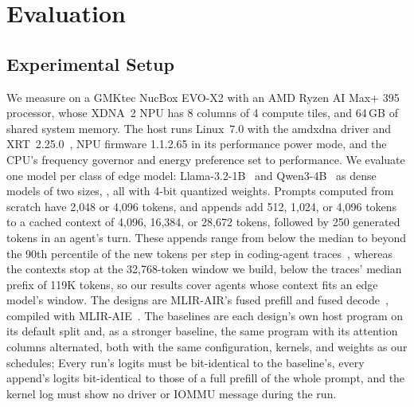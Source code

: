 \section{Evaluation}
\label{sec:eval}

\subsection{Experimental Setup}
\label{subsec:setup}

We measure on a GMKtec NucBox EVO-X2 with an AMD Ryzen\texttrademark{} AI Max+ 395 processor, whose XDNA~2 NPU has 8 columns of 4 compute tiles, and 64\,GB of shared system memory.
The host runs Linux~7.0 with the amdxdna driver and XRT~2.25.0~\citep{xdna-driver,xrt-repo}, NPU firmware 1.1.2.65 in its performance power mode, and the CPU's frequency governor and energy preference set to performance.
We evaluate one model per class of edge model: Llama-3.2-1B~\citep{meta2024llama32} and Qwen3-4B~\citep{yang2025qwen3} as dense models of two sizes, , all with 4-bit quantized weights.
Prompts computed from scratch have 2{,}048 or 4{,}096 tokens, and appends add 512, 1{,}024, or 4{,}096 tokens to a cached context of 4{,}096, 16{,}384, or 28{,}672 tokens, followed by 250 generated tokens in an agent's turn.
These appends range from below the median to beyond the 90th percentile of the new tokens per step in coding-agent traces~\citep{zhu2026tracelab}, whereas the contexts stop at the 32{,}768-token window we build, below the traces' median prefix of 119K tokens, so our results cover agents whose context fits an edge model's window.
The designs are MLIR-AIR's fused prefill and fused decode~\citep{wang2026mlirair}, compiled with MLIR-AIE~\citep{mlir-aie-repo}.
The baselines are each design's own host program on its default split and, as a stronger baseline, the same program with its attention columns alternated, both with the same configuration, kernels, and weights as our schedules; 
Every run's logits must be bit-identical to the baseline's, every append's logits bit-identical to those of a full prefill of the whole prompt, and the kernel log must show no driver or IOMMU message during the run.
